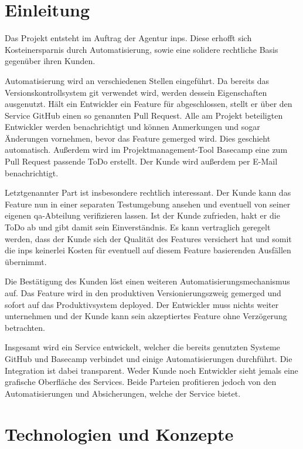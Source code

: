 \section{Einleitung} %
\label{sec:einleitung}

Das Projekt entsteht im Auftrag der Agentur \gls{inps}. Diese erhofft sich Kosteinersparnis durch Automatisierung, sowie eine solidere rechtliche Basis gegenüber ihren Kunden.

Automatisierung wird an verschiedenen Stellen eingeführt. Da bereits das Versionskontrollsystem git verwendet wird, werden dessein Eigenschaften ausgenutzt. Hält ein Entwickler ein Feature für abgeschlossen, stellt er über den Service GitHub einen so genannten Pull Request. Alle am Projekt beteiligten Entwickler werden benachrichtigt und können Anmerkungen und sogar Änderungen vornehmen, bevor das Feature gemerged wird. Dies geschieht automatisch. Außerdem wird im Projektmanagement-Tool Basecamp eine zum Pull Request passende ToDo erstellt. Der Kunde wird außerdem per E-Mail benachrichtigt.

Letztgenannter Part ist insbesondere rechtlich interessant. Der Kunde kann das Feature nun in einer separaten Testumgebung ansehen und eventuell von seiner eigenen \gls{qa}-Abteilung verifizieren lassen. Ist der Kunde zufrieden, hakt er die ToDo ab und gibt damit sein Einverständnis. Es kann vertraglich geregelt werden, dass der Kunde sich der Qualität des Features versichert hat und somit die \gls{inps} keinerlei Kosten für eventuell auf diesem Feature basierenden Ausfällen übernimmt.

Die Bestätigung des Kunden löst einen weiteren Automatisierungsmechanismus auf. Das Feature wird in den produktiven Versionierungszweig gemerged und sofort auf das Produktivsystem deployed. Der Entwickler muss nichts weiter unternehmen und der Kunde kann sein akzeptiertes Feature ohne Verzögerung betrachten.

Insgesamt wird ein Service entwickelt, welcher die bereits genutzten Systeme GitHub und Basecamp verbindet und einige Automatisierungen durchführt. Die Integration ist dabei transparent. Weder Kunde noch Entwickler sieht jemals eine grafische Oberfläche des Services. Beide Parteien profitieren jedoch von den Automatisierungen und Absicherungen, welche der Service bietet.


\section{Technologien und Konzepte} %
\label{sec:technologien_und_konzepte}

